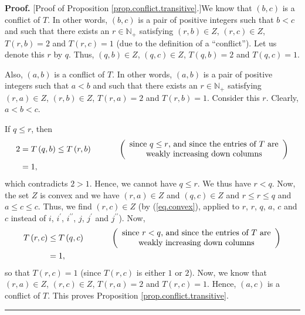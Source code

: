 \documentclass[numbers=enddot,12pt,final,onecolumn,notitlepage]{scrartcl}%
\theoremstyle{definition}
\newenvironment{proof}[1][Proof]{\noindent\textbf{#1.} }{\ \rule{0.5em}{0.5em}}
\begin{document}
\begin{proof}
[Proof of Proposition \ref{prop.conflict.transitive}.]We know that $\left(
b,c\right)  $ is a conflict of $T$. In other words, $\left(  b,c\right)  $ is
a pair of positive integers such that $b<c$ and such that there exists an
$r\in\mathbb{N}_{+}$ satisfying $\left(  r,b\right)  \in Z$, $\left(
r,c\right)  \in Z$, $T\left(  r,b\right)  =2$ and $T\left(  r,c\right)  =1$
(due to the definition of a \textquotedblleft conflict\textquotedblright). Let
us denote this $r$ by $q$. Thus, $\left(  q,b\right)  \in Z$, $\left(
q,c\right)  \in Z$, $T\left(  q,b\right)  =2$ and $T\left(  q,c\right)  =1$.

Also, $\left(  a,b\right)  $ is a conflict of $T$. In other words, $\left(
a,b\right)  $ is a pair of positive integers such that $a<b$ and such that
there exists an $r\in\mathbb{N}_{+}$ satisfying $\left(  r,a\right)  \in Z$,
$\left(  r,b\right)  \in Z$, $T\left(  r,a\right)  =2$ and $T\left(
r,b\right)  =1$. Consider this $r$. Clearly, $a<b<c$.

If $q\leq r$, then
\begin{align*}
2  &  =T\left(  q,b\right)  \leq T\left(  r,b\right)
\ \ \ \ \ \ \ \ \ \ \left(
\begin{array}
[c]{c}%
\text{since }q\leq r\text{, and since the entries of }T\text{ are}\\
\text{weakly increasing down columns}%
\end{array}
\right) \\
&  =1,
\end{align*}
which contradicts $2>1$. Hence, we cannot have $q\leq r$. We thus have $r<q$.
Now, the set $Z$ is convex and we have $\left(  r,a\right)  \in Z$ and
$\left(  q,c\right)  \in Z$ and $r\leq r\leq q$ and $a\leq c\leq c$. Thus, we
find $\left(  r,c\right)  \in Z$ (by (\ref{eq.convex}), applied to $r$, $r$,
$q$, $a$, $c$ and $c$ instead of $i$, $i^{\prime}$, $i^{\prime\prime}$, $j$,
$j^{\prime}$ and $j^{\prime\prime}$). Now,%
\begin{align*}
T\left(  r,c\right)   &  \leq T\left(  q,c\right)  \ \ \ \ \ \ \ \ \ \ \left(
%
\begin{array}
[c]{c}%
\text{since }r<q\text{, and since the entries of }T\text{ are}\\
\text{weakly increasing down columns}%
\end{array}
\right) \\
&  =1,
\end{align*}
so that $T\left(  r,c\right)  =1$ (since $T\left(  r,c\right)  $ is either $1$
or $2$). Now, we know that $\left(  r,a\right)  \in Z$, $\left(  r,c\right)
\in Z$, $T\left(  r,a\right)  =2$ and $T\left(  r,c\right)  =1$. Hence,
$\left(  a,c\right)  $ is a conflict of $T$. This proves Proposition
\ref{prop.conflict.transitive}.
\end{proof}
\end{document}
